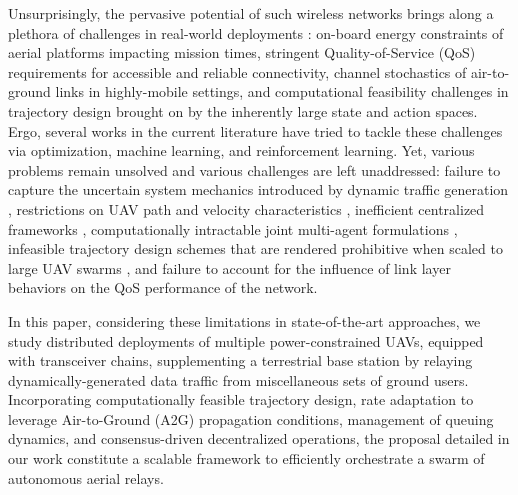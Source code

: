 \documentclass[12pt, draftcls, onecolumn]{IEEEtran}
\theoremstyle{plain}
\theoremstyle{definition}
\theoremstyle{remark}
\begin{document}
Unsurprisingly, the pervasive potential of such wireless networks brings along a plethora of challenges in real-world deployments \cite{FundamentalTradeoffs}: on-board energy constraints of aerial platforms impacting mission times, stringent Quality-of-Service (QoS) requirements for accessible and reliable connectivity, channel stochastics of air-to-ground links in highly-mobile settings, and computational feasibility challenges in trajectory design brought on by the inherently large state and action spaces. Ergo, several works in the current literature have tried to tackle these challenges via optimization, machine learning, and reinforcement learning. Yet, various problems remain unsolved and various challenges are left unaddressed: failure to capture the uncertain system mechanics introduced by dynamic traffic generation \cite{SCA, PAoI, MEC-CVX, LoSMap, Rician},  restrictions on UAV path and velocity characteristics \cite{PSOPathStructure,PAoI}, inefficient centralized frameworks \cite{CSCA-ADMM, GameTheory, UAVDynamicCoverage}, computationally intractable joint multi-agent formulations \cite{DDQN, MEC-DDPG, DQNPositioning, MLDeployment}, infeasible trajectory design schemes that are rendered prohibitive when scaled to large UAV swarms \cite{SCA, PSO, CSO}, and failure to account for the influence of link layer behaviors on the QoS performance of the network.

In this paper, considering these limitations in state-of-the-art approaches, we study distributed deployments of multiple power-constrained UAVs, equipped with transceiver chains, supplementing a terrestrial base station by relaying dynamically-generated data traffic from miscellaneous sets of ground users. Incorporating computationally feasible trajectory design, rate adaptation to leverage Air-to-Ground (A2G) propagation conditions, management of queuing dynamics, and consensus-driven decentralized operations, the proposal detailed in our work constitute a scalable framework to efficiently orchestrate a swarm of autonomous aerial relays.
\end{document}
